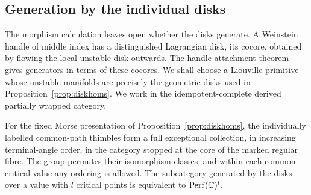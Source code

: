 \subsection{Generation by the individual disks}\label{sec:diskgeneration}

The morphism calculation leaves open whether the disks generate. A Weinstein handle of middle index has a distinguished Lagrangian disk, its cocore, obtained by flowing the local unstable disk outwards. The handle-attachment theorem gives generators in terms of these cocores. We shall choose a Liouville primitive whose unstable manifolds are precisely the geometric disks used in Proposition~\ref{prop:diskhoms}. We work in the idempotent-complete derived partially wrapped category.

\begin{theorem}\label{thm:diskgeneration}
For the fixed Morse presentation of Proposition~\ref{prop:diskhoms}, the individually labelled common-path thimbles form a full exceptional collection, in increasing terminal-angle order, in the category stopped at the core of the marked regular fibre. The group permutes their isomorphism classes, and within each common critical value any ordering is allowed. The subcategory generated by the disks over a value with $l$ critical points is equivalent to $\mathrm{Perf}(\mathbb C)^l$.
\end{theorem}

